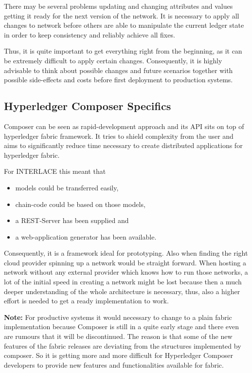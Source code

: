 There may be several problems updating and changing attributes and values getting it ready for the next version of the network. It is necessary to apply all changes to network before others are able to manipulate the current ledger state in order to keep consistency and reliably achieve all fixes.

Thus, it is quite important to get everything right from the beginning, as it can be extremely difficult to apply certain changes. Consequently, it is highly advisable to think about possible changes and future scenarios together with possible side-effects and costs before first deployment to production systems.

\subsection{Hyperledger Composer Specifics}

Composer can be seen as rapid-development approach and its API sits on top of hyperledger fabric framework. It tries to shield complexity from the user and aims to significantly reduce time necessary to create distributed applications for hyperledger fabric.

For INTERLACE this meant that

\begin{itemize}
	\item models could be transferred easily,
	\item chain-code could be based on those models,
	\item a REST-Server has been supplied and
	\item a web-application generator has been available.
\end{itemize}

Consequently, it is a framework ideal for prototyping. Also when finding the right cloud provider spinning up a network would be straight forward. When hosting a network without any external provider which knows how to run those networks, a lot of the initial speed in creating a network might be lost because then a much deeper understanding of the whole architecture is necessary, thus, also a higher effort is needed to get a ready implementation to work.

\textbf{Note:} For productive systems it would necessary to change to a plain fabric implementation because Composer is still in a quite early stage and there even are rumours that it will be discontinued. The reason is that some of the new features of the fabric releases are deviating from the structures implemented by composer. So it is getting more and more difficult for Hyperledger Composer developers to provide new features and functionalities available for fabric.

